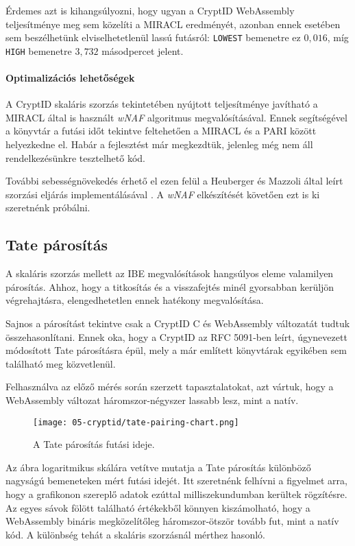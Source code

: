 Érdemes azt is kihangsúlyozni, hogy ugyan a CryptID WebAssembly teljesítménye meg sem közelíti a MIRACL eredményét, azonban ennek esetében sem beszélhetünk elviselhetetlenül lassú futásról: \texttt{LOWEST} bemenetre ez $0{,}016$, míg \texttt{HIGH} bemenetre $3{,}732$ másodpercet jelent.

\paragraph{Optimalizációs lehetőségek}

A CryptID skaláris szorzás tekintetében nyújtott teljesítménye javítható a MIRACL által is használt \textit{wNAF} algoritmus megvalósításával. Ennek segítségével a könyvtár a futási időt tekintve feltehetően a MIRACL és a PARI között helyezkedne el. Habár a fejlesztést már megkezdtük, jelenleg még nem áll rendelkezésünkre tesztelhető kód.

További sebességnövekedés érhető el ezen felül a Heuberger és Mazzoli által leírt szorzási eljárás implementálásával \citeyear{HeubergerMazzoli::ECCScalarMultiplication}. A \textit{wNAF} elkészítését követően ezt is ki szeretnénk próbálni.

\subsection{Tate párosítás}

A skaláris szorzás mellett az IBE megvalósítások hangsúlyos eleme valamilyen párosítás. Ahhoz, hogy a titkosítás és a visszafejtés minél gyorsabban kerüljön végrehajtásra, elengedhetetlen ennek hatékony megvalósítása.

Sajnos a párosítást tekintve csak a CryptID C és WebAssembly változatát tudtuk összehasonlítani. Ennek oka, hogy a CryptID az RFC 5091-ben leírt, úgynevezett módosított Tate párosításra épül, mely a már említett könyvtárak egyikében sem található meg közvetlenül. 

Felhasználva az előző mérés során szerzett tapasztalatokat, azt vártuk, hogy a WebAssembly változat háromszor-négyszer lassabb lesz, mint a natív.

\begin{figure}[h]
    \centering
    \texttt{[image: 05-cryptid/tate-pairing-chart.png]}
    \caption{A Tate párosítás futási ideje.}
    \label{Figure::CryptID::TatePairingChart}
\end{figure}

Az  ábra logaritmikus skálára vetítve mutatja a Tate párosítás különböző nagyságú bemeneteken mért futási idejét. Itt szeretnénk felhívni a figyelmet arra, hogy a grafikonon szereplő adatok ezúttal milliszekundumban kerültek rögzítésre. Az egyes sávok fölött található értékekből könnyen kiszámolható, hogy a WebAssembly bináris megközelítőleg háromszor-ötször tovább fut, mint a natív kód. A különbség tehát a skaláris szorzásnál mérthez hasonló.

